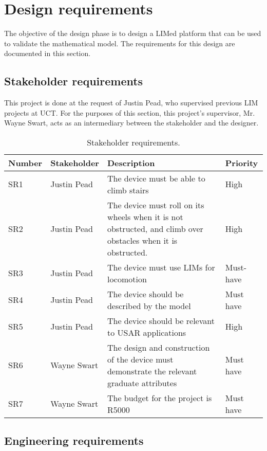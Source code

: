\chapter{Design requirements}

The objective of the design phase is to design a LIMed platform that can be used to validate the mathematical model. The requirements for this design are documented in this section.

\section{Stakeholder requirements}

This project is done at the request of Justin Pead, who supervised previous LIM projects at UCT. For the purposes of this section, this project's supervisor, Mr. Wayne Swart, acts as an intermediary between the stakeholder and the designer. 


\begin{table}[h]
	\caption{Stakeholder requirements.}
	\footnotesize
	\begin{tabular}{ | p{3em} | p{6em} | p{23em} | p{5em} |} 
		\hline
		Number& Stakeholder & Description & Priority \\ 
		\hline
		SR1 & Justin Pead & The device must be able to climb stairs & High\\
		\hline
		SR2 & Justin Pead & The device must roll on its wheels when it is not obstructed, and climb over obstacles when it is obstructed. & High\\
		\hline
		SR3 & Justin Pead & The device must use LIMs for locomotion & Must-have\\
		\hline
		SR4 & Justin Pead & The device should be described by the model & Must have\\
		\hline
		SR5 & Justin Pead & The device should be relevant to USAR applications & High\\
		\hline
		SR6 & Wayne Swart & The design and construction of the device must demonstrate the relevant graduate attributes & Must have\\
		\hline
		SR7 & Wayne Swart & The budget for the project is R5000 & Must have\\
		\hline
	\end{tabular}
\end{table}
\newpage

\section{Engineering requirements}

